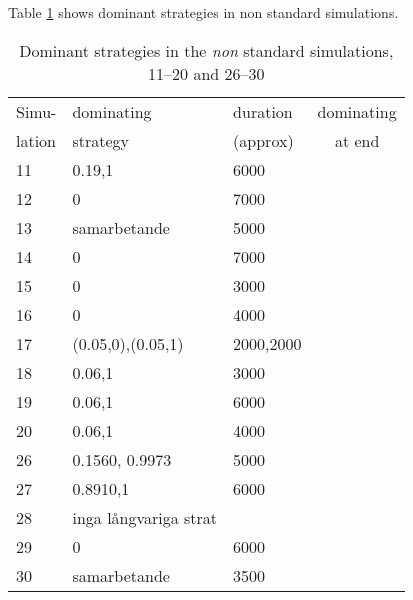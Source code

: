 

Table \ref{tab:results:dominant:11} shows dominant strategies in non standard simulations.

\begin{table}[!hbtp]
  \footnotesize
  \centering
  \label{tab:results:dominant:11}
  \caption{Dominant strategies in the \textit{non} standard simulations, 11--20 and
    26--30}
  \begin{tabular}{lllc}
    Simu-  & dominating & duration  & dominating \\
    lation & strategy   & (approx)  & at end \\
    \hline
11  &  0.19,1              & 6000      \\          
12  &  0                   & 7000               \\ 
13  &  samarbetande        & 5000               \\ 
14  &  0                   & 7000               \\ 
15  &  0                   & 3000               \\ 
16  &  0                   & 4000      \\          
17  &  (0.05,0),(0.05,1)   & 2000,2000 \\          
18  &  0.06,1              & 3000               \\ 
19  &  0.06,1              & 6000      \\          
20  &  0.06,1              & 4000      \\          
26  & 0.1560, 0.9973       & 5000\\          
27  & 0.8910,1             & 6000\\          
28  & inga långvariga strat&              \\ 
29  & 0                    & 6000\\          
30  & samarbetande         & 3500\\          
    \hline
  \end{tabular}
\end{table}

